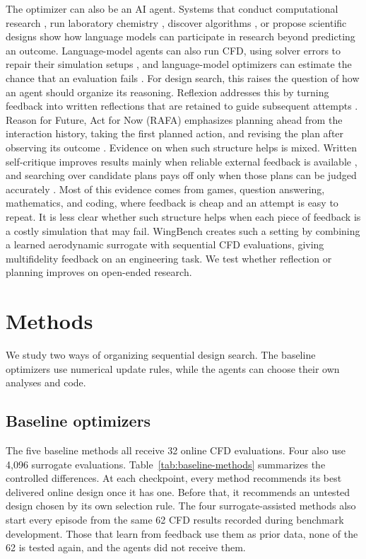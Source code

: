 \documentclass{article} %
\begin{document}
The optimizer can also be an AI agent. Systems that conduct computational
research \citep{lu2026aiscientist,yamada2025aiscientistv2,schmidgall2025agentlab},
run laboratory chemistry \citep{boiko2023coscientist,bran2024chemcrow}, discover
algorithms \citep{romeraparedes2024funsearch,novikov2025alphaevolve}, or propose
scientific designs \citep{swanson2025virtuallab} show how language models can
participate in research beyond predicting an outcome. Language-model
agents can also run CFD, using solver errors to repair their simulation setups
\citep{yue2026foamagent}, and language-model optimizers can estimate the
chance that an evaluation fails \citep{meindl2026semanticopt}. For design
search, this raises the question of how an agent should organize its reasoning. Reflexion addresses this by turning feedback into
written reflections that are retained to guide subsequent attempts
\citep{shinn2023reflexion}. Reason for Future, Act for Now (RAFA) emphasizes planning ahead from the
interaction history, taking the first planned action, and revising the plan
after observing its outcome \citep{liu2024rafa}. Evidence on when such
structure helps is mixed. Written self-critique improves results mainly when
reliable external feedback is available
\citep{huang2024selfcorrect,kamoi2024selfcorrection}, and searching over
candidate plans pays off only when those plans can be judged accurately
\citep{chen2024treesearch}.
Most of this evidence comes from games, question answering, mathematics, and
coding, where feedback is cheap and an attempt is easy to repeat. It is less
clear whether such structure helps when each piece of feedback is a costly
simulation that may fail. WingBench creates such a setting by combining a
learned aerodynamic surrogate with sequential CFD evaluations, giving
multifidelity feedback on an engineering task.
We test whether reflection or planning improves on open-ended research.

\section{Methods}
\label{sec:methods}
We study two ways of organizing sequential design search. The baseline
optimizers use numerical update rules, while the agents can choose their own
analyses and code.
\subsection{Baseline optimizers}
\label{sec:baseline-methods}

The five baseline methods all receive 32 online CFD evaluations. Four also use
4{,}096 surrogate evaluations. Table~\ref{tab:baseline-methods} summarizes the
controlled differences. At each checkpoint, every method recommends its best
delivered online design once it has one. Before that, it recommends an untested
design chosen by its own selection rule. The four surrogate-assisted methods
also start every episode from the same 62 CFD results recorded during benchmark
development. Those that learn from feedback use them as prior data, none of the
62 is tested again, and the agents did not receive them.
\end{document}

